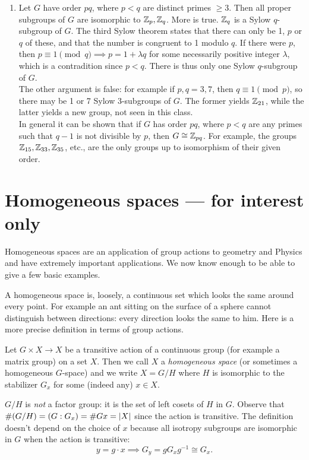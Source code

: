 \begin{examples}{}{}
\begin{enumerate}
\item Let $G$ have order $pq$, where $p<q$ are distinct primes $\ge 3$. Then all proper subgroups of $G$ are isomorphic to $\mathbb{Z}_p,\mathbb{Z}_q$. More is true. $\mathbb{Z}_q$ is a Sylow $q$-subgroup of $G$. The third Sylow theorem states that there can only be 1, $p$ or $q$ of these, and that the number is congruent to 1 modulo $q$. If there were $p$, then $p\equiv 1\pmod q\implies p=1+\lambda q$ for some necessarily positive integer $\lambda$, which is a contradition since $p<q$. There is thus only one Sylow $q$-subgroup of $G$.\\
The other argument is false: for example if $p,q=3,7$, then $q\equiv 1\pmod p$, so there may be 1 or 7 Sylow 3-subgroups of $G$. The former yields $\mathbb{Z}_{21}$, while the latter yields a new group, not seen in this class.\\
In general it can be shown that if $G$ has order $pq$, where $p<q$ are any primes such that $q-1$ is not divisible by $p$, then $G\cong\mathbb{Z}_{pq}$. For example, the groups $\mathbb{Z}_{15},\mathbb{Z}_{33},\mathbb{Z}_{35}$, etc., are the only groups up to isomorphism of their given order.
\end{enumerate}
\end{examples}

\section*{Homogeneous spaces --- for interest only}

Homogeneous spaces are an application of group actions to geometry and Physics and have extremely important applications. We now know enough to be able to give a few basic examples.

A homogeneous space is, loosely, a continuous set which looks the same around every point. For example an ant sitting on the surface of a sphere cannot distinguish between directions: every direction looks the same to him. Here is a more precise definition in terms of group actions.

\begin{defn}{}{}
Let $G\times X\to X$ be a transitive action of a continuous group (for example a matrix group) on a set $X$. Then we call $X$ a \emph{homogeneous space} (or sometimes a homogeneous $G$-space) and we write $X=G/H$ where $H$ is isomorphic to the stabilizer $G_x$ for some (indeed any) $x\in X$.
\end{defn}

$G/H$ is \emph{not} a factor group: it is the set of left cosets of $H$ in $G$. Observe that $\#(G/H)=(G:G_x)=\# Gx=\left| X\right|$ since the action is transitive. The definition doesn't depend on the choice of $x$ because all isotropy subgroups are isomorphic in $G$ when the action is transitive:
\[y=g\cdot x\implies G_y=gG_xg^{-1}\cong G_x.\]

